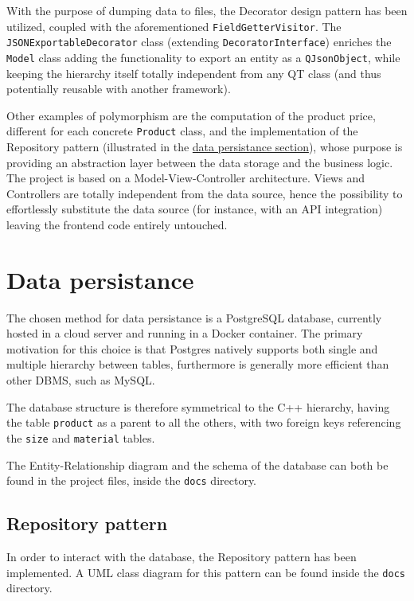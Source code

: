 \documentclass[10pt]{article}
\begin{document}
With the purpose of dumping data to files, the Decorator design pattern has
been utilized, coupled with the aforementioned \texttt{FieldGetterVisitor}. The
\texttt{JSONExportableDecorator} class (extending \texttt{DecoratorInterface})
enriches the \texttt{Model} class adding the functionality to export an entity
as a \texttt{QJsonObject}, while keeping the hierarchy itself totally
independent from any QT class (and thus potentially reusable with another
framework).

Other examples of polymorphism are the computation of the product price,
different for each concrete \texttt{Product} class, and the implementation of
the Repository pattern (illustrated in the \hyperref[sec:dataPersistance]{data
    persistance section}), whose purpose is providing an abstraction layer between
the data storage and the business logic. The project is based on a
Model-View-Controller architecture. Views and Controllers are totally
independent from the data source, hence the possibility to effortlessly
substitute the data source (for instance, with an API integration) leaving the
frontend code entirely untouched.

\section{Data persistance}
\label{sec:dataPersistance}
The chosen method for data persistance is a PostgreSQL database, currently
hosted in a cloud server and running in a Docker container. The primary
motivation for this choice is that Postgres natively supports both single and
multiple hierarchy between tables, furthermore is generally more efficient than
other DBMS, such as MySQL.

The database structure is therefore symmetrical to the C++ hierarchy, having
the table \texttt{product} as a parent to all the others, with two foreign keys
referencing the \texttt{size} and \texttt{material} tables.

The Entity-Relationship diagram and the schema of the database can both be
found in the project files, inside the \texttt{docs} directory.

\subsection{Repository pattern}
\label{sec:repositoryPattern}
In order to interact with the database, the Repository pattern has been
implemented. A UML class diagram for this pattern can be found inside the
\texttt{docs} directory.
\end{document}
